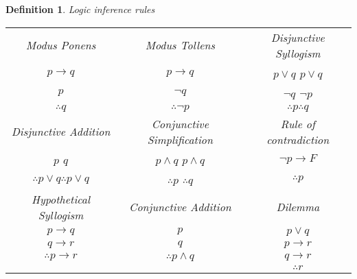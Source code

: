 \documentclass{article}
\newtheorem{definition}{Definition}
\begin{document}
\begin{definition}
	Logic inference rules
	
	\begin{tabular}{|c|c|c|}
		\hline 
		Modus Ponens & Modus Tollens & Disjunctive Syllogism \\
		$p\to q$ & $p\to q$ & $p\vee q$ \vline $p\vee q$ \\
		$p$ 	 & $\neg q$ & $\neg q$  \vline $\neg p$\\
		$\therefore q$ & $\therefore \neg p$ & $\therefore p $\vline $\therefore q$\\
		\hline 
		Disjunctive Addition & Conjunctive Simplification & Rule of contradiction \\
		$p$ \vline $q$ & $p\wedge q$ \vline $p\wedge q$ & $\neg p\to F$\\
		$\therefore p\vee q$\vline $\therefore p\vee q$ & $\therefore p$ \vline $\therefore q$ & $\therefore p$\\
		\hline 
		Hypothetical Syllogism & Conjunctive Addition & Dilemma \\ 
		$p\to q$ & $p$ & $p\vee q$\\
		$q\to r$ & $q$ & $p\to r$\\
		$\therefore p\to r$ & $\therefore p\wedge q$ &  $q\to r$\\
		 & & $\therefore r$ \\
		\hline 
	\end{tabular} 
\end{definition}
\end{document}
